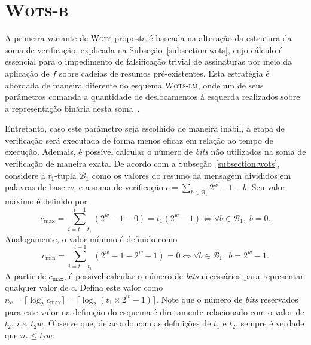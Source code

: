 \documentclass{ufsctex/ufsctex}
\newcommand{\wots}{\textsc{Wots}}
\newcommand{\wotslm}{\textsc{Wots-lm}}
\newcommand{\wotsb}{\textsc{Wots-b}}
\begin{document}
\section{\wotsb{}}\label{section:wotsb}

A primeira variante de \wots{} proposta é baseada na alteração da estrutura da
soma de verificação, explicada na Subseção~\ref{subsection:wots}, cujo cálculo
é essencial para o impedimento de falsificação trivial de assinaturas por meio
da aplicação de $f$ sobre cadeias de resumos pré-existentes. Esta estratégia é
abordada de maneira diferente no esquema \wotslm{}, onde um de seus parâmetros
comanda a quantidade de deslocamentos à esquerda realizados sobre a
representação binária desta soma~\cite[4.4]{mcgrew-hash-sigs-11}.

Entretanto, caso este parâmetro seja escolhido de maneira inábil, a etapa de
verificação será executada de forma menos eficaz em relação ao tempo de
execução. Ademais, é possível calcular o número de \emph{bits} não utilizados
na soma de verificação de maneira exata. De acordo com a
Subseção~\ref{subsection:wots}, considere a $t_1$-tupla $\mathcal{B}_1$ como os
valores do resumo da mensagem divididos em palavras de base-$w$, e a soma de
verificação $c = \sum_{b \in \mathcal{B}_1} 2^w - 1 - b$. Seu valor máximo é
definido por
\begin{equation}
  c_{\max} = \sum_{i = t - t_1}^{t - 1} (2^w - 1 - 0) = t_1(2^w - 1)
    \iff \forall b \in \mathcal{B}_1, \; b = 0.
\end{equation}
Analogamente, o valor mínimo é definido como
\begin{equation}
  c_{\min} = \sum_{i = t - t_1}^{t - 1} (2^w - 1 - 2^w - 1) = 0
    \iff \forall b \in \mathcal{B}_1, \; b = 2^w - 1.
\end{equation}
A partir de $c_{\max}$, é possível calcular o número de \emph{bits} necessários
para representar qualquer valor de $c$. Defina este valor como $n_c = \lceil
\log_2 c_{\max} \rceil = \lceil \log_2 (t_1 \times 2^w - 1) \rceil$. Note que o
número de \emph{bits} reservados para este valor na definição do esquema é
diretamente relacionado com o valor de $t_2$, \emph{i.e.} $t_2w$. Observe que,
de acordo com as definições de $t_1$ e $t_2$, sempre é verdade que $n_c \leq
t_2w$:
\end{document}
